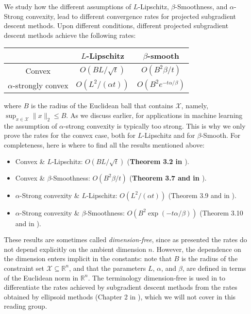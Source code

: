 We study how the different assumptions of $L$-Lipschitz, $\beta$-Smoothness, and $\alpha$-Strong convexity, lead to different convergence rates for projected subgradient descent methods. Upon different conditions, different projected subgradient descent methods achieve the following rates:
\begin{center}
 \begin{tabular}{|c | c | c|}
 \hline
 & $L$-Lipschitz & $\beta$-smooth\\
 \hline
 Convex & $O(BL/\sqrt{t})$ & $O(B^2\beta/t)$\\
 \hline
 $\alpha$-strongly convex & $O(L^2/(\alpha t))$ & $O(B^2e^{-t\alpha/\beta})$\\
 \hline
\end{tabular}
\end{center}
where $B$ is the radius of the Euclidean ball that contains $\mathcal{X}$, namely, $\sup_{x\in\mathcal{X}}\|x\|_2 \le B$.
As we discuss earlier, for applications in machine learning the assumption of $\alpha$-strong convexity is typically too strong. This is why we only prove the rates for the convex case, both for $L$-Lipschitz and for $\beta$-Smooth. For completeness, here is where to find all the results mentioned above:
\begin{itemize}
	\item Convex \& $L$-Lipschitz: $O(BL/\sqrt{t})$ (\textbf{Theorem 3.2 in \cite{bubeck}}).
	\item Convex \& $\beta$-Smoothness: $O(B^2\beta/t)$  (\textbf{Theorem 3.7 and in \cite{bubeck}}).
	\item $\alpha$-Strong convexity \& $L$-Lipschitz: $O(L^2/(\alpha t))$ (Theorem 3.9 and in \cite{bubeck}).
	\item $\alpha$-Strong convexity \& $\beta$-Smoothness: $O(B^2\exp(-t\alpha/\beta))$ (Theorem 3.10 and in \cite{bubeck}).
\end{itemize}	


These results are sometimes called \emph{dimension-free}, since as presented the rates do not depend explicitly on the ambient dimension $n$. However, the dependence on the dimension enters implicit in the constants: note that $B$ is the radius of the constraint set $\mathcal{X}\subseteq \mathbb{R}^n$, and that the parameters $L$, $\alpha$, and $\beta$, are defined in terms of the Euclidean norm in $\mathbb{R}^n$. The terminology dimension-free is used in \cite{bubeck} to differentiate the rates achieved by subgradient descent methods from the rates obtained by ellipsoid methods (Chapter 2 in \cite{bubeck}), which we will not cover in this reading group.
	
